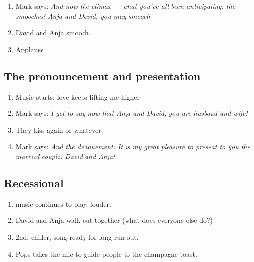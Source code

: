 \begin{enumerate}
\def\labelenumi{\arabic{enumi}.}
\tightlist
\item
  Mark says: \emph{And now the climax --- what you've all been
  anticipating: the smooches! Anja and David, you may smooch}
\item
  David and Anja smooch.
\item
  Applause
\end{enumerate}

\hypertarget{the-pronouncement-and-presentation}{%
\subsection{The pronouncement and
presentation}\label{the-pronouncement-and-presentation}}

\begin{enumerate}
\def\labelenumi{\arabic{enumi}.}
\tightlist
\item
  Music starts: love keeps lifting me higher
\item
  Mark says: \emph{I get to say now that Anja and David, you are husband
  and wife!}
\item
  They kiss again or whatever.
\item
  Mark says: \emph{And the denouement: It is my great pleasure to
  present to you the married couple: David and Anja!}
\end{enumerate}

\hypertarget{recessional}{%
\subsection{Recessional}\label{recessional}}

\begin{enumerate}
\def\labelenumi{\arabic{enumi}.}
\tightlist
\item
  music continues to play, louder.
\item
  David and Anja walk out together (what does everyone else do?)
\item
  2nd, chiller, song ready for long run-out.
\item
  Pops takes the mic to guide people to the champagne toast.
\end{enumerate}
